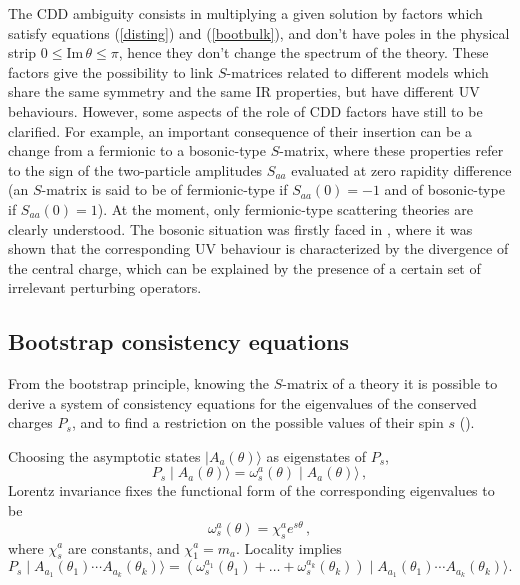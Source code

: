 \documentclass[a4paper,12pt]{report}
\begin{document}
The CDD ambiguity consists in multiplying a given solution by factors which satisfy equations (\ref{disting}) and
(\ref{bootbulk}), and don't have poles in the physical strip $0\leq \textrm{Im}\,\theta\leq\pi$, hence they don't
change the spectrum of the theory. These factors give the possibility to link $S$-matrices related to different
models which share the same symmetry and the same IR properties, but have different UV behaviours. However, some
aspects of the role of CDD factors have still to be clarified. For example, an important consequence of their
insertion can be a change from a fermionic to a bosonic-type $S$-matrix, where these properties refer to the sign
of the two-particle amplitudes $S_{aa}$ evaluated at zero rapidity difference (an $S$-matrix is said to be of
fermionic-type if $S_{aa}(0)=-1$ and of bosonic-type if $S_{aa}(0)=1$). At the moment, only fermionic-type
scattering theories are clearly understood. The bosonic situation was firstly faced in \cite{musssim}, where it
was shown that the corresponding UV behaviour is characterized by the divergence of the central charge, which can
be explained by the presence of a certain set of irrelevant perturbing operators.





\subsection{Bootstrap consistency equations}

From the bootstrap principle, knowing the $S$-matrix of a theory it is possible to derive a system of consistency
equations for the eigenvalues of the conserved charges $P_{s}$, and to find a restriction on the possible values
of their spin $s$ (\cite{sbrind}).

Choosing the asymptotic states $\mid A_{a}(\theta)\rangle$ as eigenstates of $P_{s}$,
\begin{equation}
P_{s}\mid A_{a}(\theta)\rangle =\omega_{s}^{a}(\theta) \mid A_{a}(\theta)\rangle\,,
\end{equation}
Lorentz invariance fixes the functional form of the corresponding eigenvalues to be
\begin{equation}
\omega_{s}^{a}(\theta)=\chi_{s}^{a}e^{s\theta}\,,
\end{equation}
where $\chi_{s}^{a}$ are constants, and $\chi_{1}^{a}=m_{a}$. Locality implies
\begin{equation}
P_{s}\mid A_{a_{1}}(\theta_{1})\cdots A_{a_{k}}(\theta_{k})\rangle
=\left(\omega_{s}^{a_{1}}(\theta_{1})+\ldots+\omega_{s}^{a_{k}}(\theta_{k})\right) \mid
A_{a_{1}}(\theta_{1})\cdots A_{a_{k}}(\theta_{k})\rangle.
\end{equation}
\end{document}
